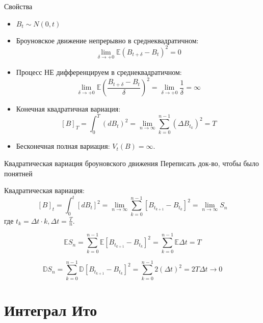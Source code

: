 \documentclass{beamer}
\begin{document}
\begin{frame}{Свойства}
    \begin{itemize}
        \item $B_t \sim N(0, t)$
         
        \item Броуновское движение непрерывно в среднеквадратичном:
        $$
            \lim_{\delta \to +0}\mathbb{E} \left( B_{t+\delta} - B_t \right)^2 = 0
        $$
         
        \item Процесс НЕ дифференцируем в среднеквадратичном:
        $$
            \lim_{\delta \to +0}\mathbb{E} \left(\dfrac{ B_{t+\delta} - B_t }{\delta}\right)^2 = \lim_{\delta \to +0} \dfrac{1}{\delta}  = \infty
        $$
         
        \item Конечная квадратичная вариация:
        $$
            \left[ B \right]_T = \int_0^T (dB_t)^2 = \lim_{n\to \infty} \sum_{k=0}^{n-1} \left(\Delta B_{t_k}\right)^2 = T
        $$

        \item Бесконечная полная вариация: $V_t(B) = \infty$.
    \end{itemize}
\end{frame}

\begin{frame}{Квадратическая вариация броуновского движения}
    Переписать док-во, чтобы было понятней
    
    Квадратическая вариация:
    $$
        [B]_t = \int_0^t \left[d B_t \right]^2 = \lim_{n \to \infty} 
        \sum_{k=0}^{n-1} \left[B_{t_{k+1}} - B_{t_k}\right]^2 = 
        \lim_{n \to \infty} S_n
    $$
    где $t_k = \Delta t \cdot k, \Delta t = \frac{T}{n}$. 
     
    $$
        \mathbb{E} S_n = \sum_{k=0}^{n-1} \mathbb{E} \left[B_{t_{k+1}} - B_{t_k}\right]^2
        = \sum_{k=0}^{n-1} \mathbb{E} \Delta t = T
    $$
     
    $$
        \mathbb{D} S_n = \sum_{k=0}^{n-1} \mathbb{D} \left[B_{t_{k+1}} - B_{t_k}\right]^2
        = \sum_{k=0}^{n-1} 2 (\Delta t)^2 = 2 T \Delta t \to 0
    $$
\end{frame}

\section{Интеграл Ито}
\end{document}
